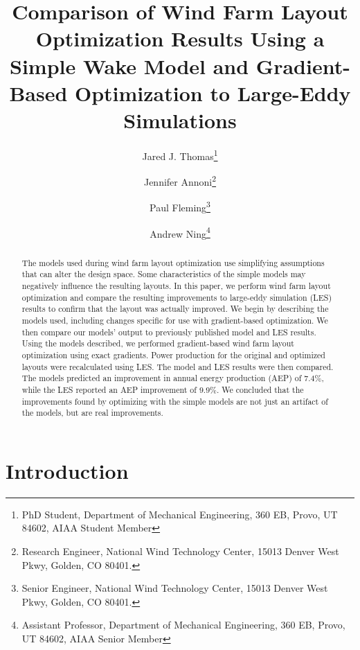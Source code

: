 \documentclass[conf]{new-aiaa}
\title{Comparison of Wind Farm Layout Optimization Results Using a Simple Wake Model and Gradient-Based Optimization to Large-Eddy Simulations}
\author{Jared J. Thomas\footnote{PhD Student, Department of Mechanical Engineering, 360 EB, Provo, UT 84602, AIAA Student Member}}
\affil{Brigham Young University, Provo, UT 84602}
\author{Jennifer Annoni\footnote{Research Engineer, National Wind Technology Center, 15013 Denver West Pkwy, Golden, CO 80401.}}
\author{Paul Fleming\footnote{Senior Engineer, National Wind Technology Center, 15013 Denver West Pkwy, Golden, CO 80401.}}
\affil{National Renewable Energy Laboratory, Golden, CO, 80401, USA}
\author{Andrew Ning\footnote{Assistant Professor, Department of Mechanical Engineering, 360 EB, Provo, UT 84602, AIAA Senior Member}}
\affil{Brigham Young University, Provo, UT 84602}
\begin{document}
\maketitle

\begin{abstract}
The models used during wind farm layout optimization use simplifying assumptions that can alter the design space. Some characteristics of the simple models may negatively influence the resulting layouts. In this paper, we perform wind farm layout optimization and compare the resulting improvements to large-eddy simulation (LES) results to confirm that the layout was actually improved. We begin by describing the models used, including changes specific for use with gradient-based optimization. We then compare our models' output to previously published model and LES results. Using the models described, we performed gradient-based wind farm layout optimization using exact gradients. Power production for the original and optimized layouts were recalculated using LES. The model and LES results were then compared. The models predicted an improvement in annual energy production (AEP) of $7.4\%$, while the LES reported an AEP improvement of $9.9\%$. We concluded that the improvements found by optimizing with the simple models are not just an artifact of the models, but are real improvements.
\end{abstract}

\section{Introduction}



\end{document}
